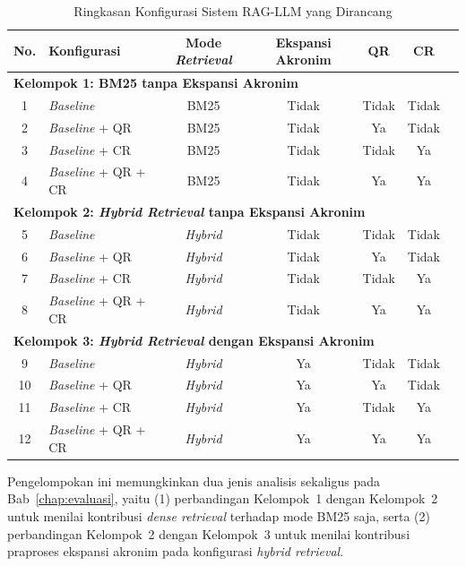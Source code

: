\begin{table}[H]
\centering
\small
\setlength{\tabcolsep}{5pt}
\caption{Ringkasan Konfigurasi Sistem RAG-LLM yang Dirancang}
\label{tbl:ringkasan-konfigurasi}
\begin{tabular}{clccccc}
\toprule
\textbf{No.} & \textbf{Konfigurasi} & \textbf{Mode \textit{Retrieval}} & \textbf{Ekspansi Akronim} & \textbf{QR} & \textbf{CR} \\
\midrule
\multicolumn{6}{l}{\textbf{Kelompok 1: BM25 tanpa Ekspansi Akronim}} \\
\midrule
1 & \textit{Baseline}             & BM25 & Tidak & Tidak & Tidak \\
2 & \textit{Baseline} + QR        & BM25 & Tidak & Ya    & Tidak \\
3 & \textit{Baseline} + CR        & BM25 & Tidak & Tidak & Ya    \\
4 & \textit{Baseline} + QR + CR   & BM25 & Tidak & Ya    & Ya    \\
\midrule
\multicolumn{6}{l}{\textbf{Kelompok 2: \textit{Hybrid Retrieval} tanpa Ekspansi Akronim}} \\
\midrule
5 & \textit{Baseline}             & \textit{Hybrid} & Tidak & Tidak & Tidak \\
6 & \textit{Baseline} + QR        & \textit{Hybrid} & Tidak & Ya    & Tidak \\
7 & \textit{Baseline} + CR        & \textit{Hybrid} & Tidak & Tidak & Ya    \\
8 & \textit{Baseline} + QR + CR   & \textit{Hybrid} & Tidak & Ya    & Ya    \\
\midrule
\multicolumn{6}{l}{\textbf{Kelompok 3: \textit{Hybrid Retrieval} dengan Ekspansi Akronim}} \\
\midrule
9  & \textit{Baseline}             & \textit{Hybrid} & Ya & Tidak & Tidak \\
10 & \textit{Baseline} + QR        & \textit{Hybrid} & Ya & Ya    & Tidak \\
11 & \textit{Baseline} + CR        & \textit{Hybrid} & Ya & Tidak & Ya    \\
12 & \textit{Baseline} + QR + CR   & \textit{Hybrid} & Ya & Ya    & Ya    \\
\bottomrule
\end{tabular}
\end{table}

Pengelompokan ini memungkinkan dua jenis analisis sekaligus pada Bab~\ref{chap:evaluasi}, yaitu (1) perbandingan Kelompok~1 dengan Kelompok~2 untuk menilai kontribusi \textit{dense retrieval} terhadap mode BM25 saja, serta (2) perbandingan Kelompok~2 dengan Kelompok~3 untuk menilai kontribusi praproses ekspansi akronim pada konfigurasi \textit{hybrid retrieval}.

